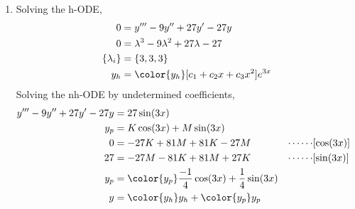 \begin{enumerate}
    \item Solving the h-ODE,
          \begin{align}
              0               & = y''' - 9y'' + 27y' - 27y                     \\
              0               & = \lambda^{3}  - 9\lambda^{2} + 27\lambda - 27 \\
              \{\lambda_{i}\} & = \{3, 3, 3\}                                  \\
              y_{h}           & = \color{y_h} [c_1 + c_2 x + c_3 x^{2}] e^{3x}
          \end{align}
          Solving the nh-ODE by undetermined coefficients,
          \begin{align}
              y''' - 9y'' + 27y' - 27y & = 27\sin(3x)                                                                         \\
              y_{p}                    & = K\cos(3x) + M\sin(3x)                                                              \\
              0                        & = -27K + 81M + 81K - 27M                                 & \cdots\cdots & [\cos(3x)] \\
              27                       & = -27M - 81K + 81M + 27K                                 & \cdots\cdots & [\sin(3x)] \\
              y_{p}                    & = \color{y_p} \frac{-1}{4}\cos(3x) + \frac{1}{4}\sin(3x)                             \\
              y                        & = {\color{y_h} y_{h}} + {\color{y_p} y_{p}}
          \end{align}


\end{enumerate}
